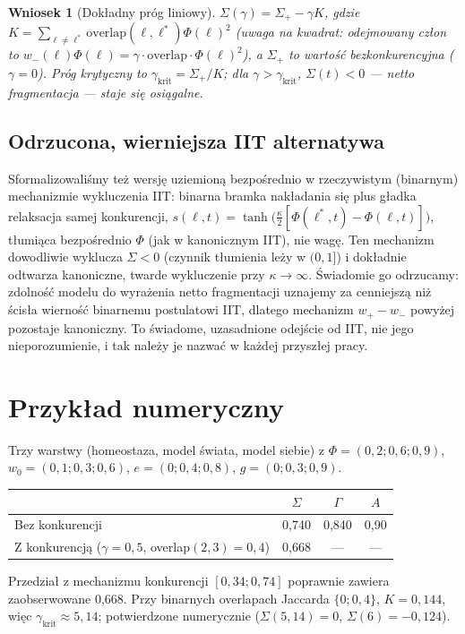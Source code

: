 \documentclass[11pt]{article}
\newtheorem{proposition}{Wniosek}
\begin{document}
\begin{proposition}[Dokładny próg liniowy]
$\Sigma(\gamma) = \Sigma_+ - \gamma K$, gdzie $K=\sum_{\ell\neq\ell^*}\text{overlap}(\ell,\ell^*)\Phi(\ell)^2$ (uwaga na kwadrat: odejmowany człon to $w_-(\ell)\Phi(\ell)=\gamma\cdot\text{overlap}\cdot\Phi(\ell)^2$), a $\Sigma_+$ to wartość bezkonkurencyjna ($\gamma=0$). Próg krytyczny to $\gamma_{\text{krit}}=\Sigma_+/K$; dla $\gamma>\gamma_{\text{krit}}$, $\Sigma(t)<0$ --- netto fragmentacja --- staje się osiągalne.
\end{proposition}

\subsection*{Odrzucona, wierniejsza IIT alternatywa}
Sformalizowaliśmy też wersję uziemioną bezpośrednio w rzeczywistym (binarnym) mechanizmie wykluczenia IIT: binarna bramka nakładania się plus gładka relaksacja samej konkurencji, $s(\ell,t)=\tanh\!\big(\tfrac{\kappa}{2}[\Phi(\ell^*,t)-\Phi(\ell,t)]\big)$, tłumiąca bezpośrednio $\Phi$ (jak w kanonicznym IIT), nie wagę. Ten mechanizm dowodliwie wyklucza $\Sigma<0$ (czynnik tłumienia leży w $(0,1]$) i dokładnie odtwarza kanoniczne, twarde wykluczenie przy $\kappa\to\infty$. Świadomie go odrzucamy: zdolność modelu do wyrażenia netto fragmentacji uznajemy za cenniejszą niż ścisła wierność binarnemu postulatowi IIT, dlatego mechanizm $w_+-w_-$ powyżej pozostaje kanoniczny. To świadome, uzasadnione odejście od IIT, nie jego nieporozumienie, i tak należy je nazwać w każdej przyszłej pracy.

\section{Przykład numeryczny}\label{sec:example}

Trzy warstwy (homeostaza, model świata, model siebie) z $\Phi=(0{,}2;0{,}6;0{,}9)$, $w_0=(0{,}1;0{,}3;0{,}6)$, $e=(0;0{,}4;0{,}8)$, $g=(0;0{,}3;0{,}9)$.

\begin{center}
\begin{tabular}{@{}lccc@{}}
\toprule
& $\Sigma$ & $\Gamma$ & $A$ \\
\midrule
Bez konkurencji & 0,740 & 0,840 & 0,90 \\
Z konkurencją ($\gamma=0{,}5$, overlap$(2,3)=0{,}4$) & 0,668 & --- & --- \\
\bottomrule
\end{tabular}
\end{center}
Przedział z mechanizmu konkurencji $[0{,}34;0{,}74]$ poprawnie zawiera zaobserwowane 0,668. Przy binarnych overlapach Jaccarda $\{0;0{,}4\}$, $K=0{,}144$, więc $\gamma_{\text{krit}}\approx5{,}14$; potwierdzone numerycznie ($\Sigma(5{,}14)=0$, $\Sigma(6)=-0{,}124$).
\end{document}
